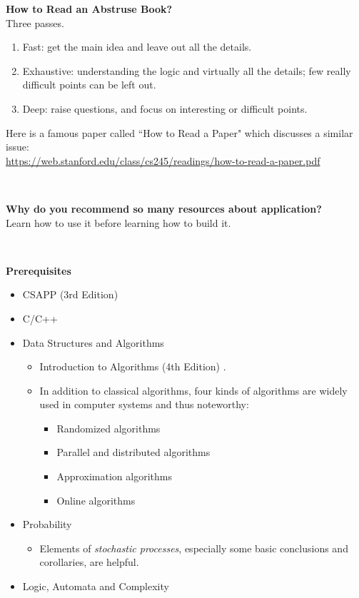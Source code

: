 \documentclass{article}
\begin{document}
\noindent
\textbf{How to Read an Abstruse Book?}\\
Three passes.
\begin{enumerate}
    \item Fast: get the main idea and leave out all the details.
    \item Exhaustive: understanding the logic and virtually all the details; few really difficult points can be left out.
    \item Deep: raise questions, and focus on interesting or difficult points.
\end{enumerate}
Here is a famous paper called ``How to Read a Paper" which discusses a similar issue:\\
\href{https://web.stanford.edu/class/cs245/readings/how-to-read-a-paper.pdf}{https://web.stanford.edu/class/cs245/readings/how-to-read-a-paper.pdf}

~

\noindent
\textbf{Why do you recommend so many resources about application?}\\
Learn how to use it before learning how to build it.

~

\noindent
\textbf{Prerequisites}
\begin{itemize}
    \item CSAPP (3rd Edition) \cite{bryant2015computer}
    \item C/C++
    \item Data Structures and Algorithms
    \begin{itemize}
        \item Introduction to Algorithms (4th Edition) \cite{cormen2009introduction}.
        \item In addition to classical algorithms, four kinds of algorithms are widely used in computer systems and thus noteworthy:
        \begin{itemize}
            \item Randomized algorithms
            \item Parallel and distributed algorithms
            \item Approximation algorithms
            \item Online algorithms
        \end{itemize}
    \end{itemize}
    \item Probability
    \begin{itemize}
        \item Elements of \emph{stochastic processes}, especially some basic conclusions and corollaries, are helpful.
    \end{itemize}
    \item Logic, Automata and Complexity
\end{itemize}
\end{document}
